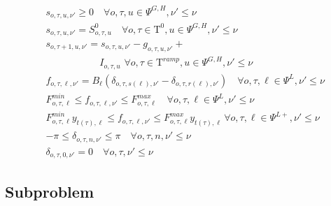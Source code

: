 \documentclass[final]{IEEEtran}
\newcommand{\Tau}{\mathrm{T}}
\begin{document}
\begin{align}
&s_{o, \tau, u, \nu'} \geq 0 \quad \forall o, \tau, u \in \Psi^{G, H}, \nu' \leq \nu \\
&s_{o, \tau, u, \nu'} = S^0_{o, \tau, u} \quad \forall o, \tau \in \Tau^0, u \in \Psi^{G, H}, \nu' \leq \nu \\
&s_{o, \tau + 1, u, \nu'} = s_{o, \tau, u, \nu'} - g_{o, \tau, u, \nu'} + \nonumber \\
&\quad \quad \quad \quad \quad \, \, \, I_{o, \tau, u} \, \, \forall o, \tau \in \Tau^{ramp}, u \in \Psi^{G, H}, \nu' \leq \nu \\
&f_{o, \tau, \ell, \nu'} = B_\ell (\delta_{o, \tau, s(\ell), \nu'} - \delta_{o, \tau, r(\ell), \nu'}) \quad \forall o, \tau, \ell \in \Psi^L, \nu' \leq \nu \\
&F_{o, \tau, \ell}^{min} \leq f_{o, \tau, \ell, \nu'} \leq F_{o, \tau, \ell}^{max} \quad \forall o, \tau, \ell \in \Psi^L, \nu' \leq \nu \\
&F_{o, \tau, \ell}^{min} y_{t(\tau), \ell} \leq f_{o, \tau, \ell, \nu'} \leq F_{o, \tau, \ell}^{max} y_{t(\tau), \ell} \, \forall o, \tau, \ell \in \Psi^{L+}, \nu' \leq \nu \\
&-\pi \leq \delta_{o, \tau, n, \nu'} \leq \pi \quad \forall o, \tau, n, \nu' \leq \nu \\
&\label{master_last} \delta_{o, \tau, 0, \nu'} = 0 \quad \forall o, \tau, \nu' \leq \nu
\end{align}

\subsection{Subproblem}
\end{document}
